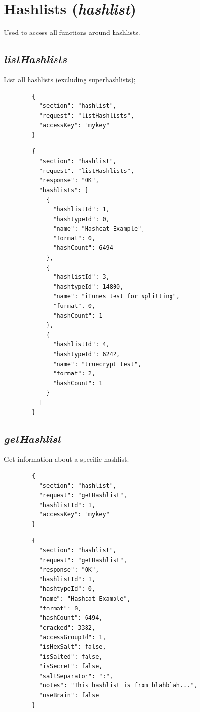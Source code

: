 \section*{Hashlists (\textit{hashlist})}
	Used to access all functions around hashlists.

\subsection*{\textit{listHashlists}}
	List all hashlists (excluding superhashlists);
	{
		\color{blue}
		\begin{verbatim}
		{
		  "section": "hashlist",
		  "request": "listHashlists",
		  "accessKey": "mykey"
		}
		\end{verbatim}
	}
	{
		\color{OliveGreen}
		\begin{verbatim}
		{
		  "section": "hashlist",
		  "request": "listHashlists",
		  "response": "OK",
		  "hashlists": [
		    {
		      "hashlistId": 1,
		      "hashtypeId": 0,
		      "name": "Hashcat Example",
		      "format": 0,
		      "hashCount": 6494
		    },
		    {
		      "hashlistId": 3,
		      "hashtypeId": 14800,
		      "name": "iTunes test for splitting",
		      "format": 0,
		      "hashCount": 1
		    },
		    {
		      "hashlistId": 4,
		      "hashtypeId": 6242,
		      "name": "truecrypt test",
		      "format": 2,
		      "hashCount": 1
		    }
		  ]
		}
		\end{verbatim}
	}
\subsection*{\textit{getHashlist}}
	Get information about a specific hashlist.
	{
		\color{blue}
		\begin{verbatim}
		{
		  "section": "hashlist",
		  "request": "getHashlist",
		  "hashlistId": 1,
		  "accessKey": "mykey"
		}
		\end{verbatim}
	}
	{
		\color{OliveGreen}
		\begin{verbatim}
		{
		  "section": "hashlist",
		  "request": "getHashlist",
		  "response": "OK",
		  "hashlistId": 1,
		  "hashtypeId": 0,
		  "name": "Hashcat Example",
		  "format": 0,
		  "hashCount": 6494,
		  "cracked": 3382,
		  "accessGroupId": 1,
		  "isHexSalt": false,
		  "isSalted": false,
		  "isSecret": false,
		  "saltSeparator": ":",
		  "notes": "This hashlist is from blahblah...",
		  "useBrain": false
		}
		\end{verbatim}
	}

